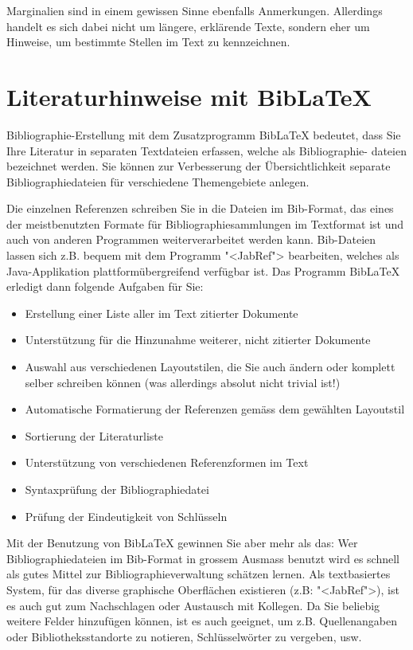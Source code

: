 \documentclass[11pt, a4paper]{article}
\let\oldmarginpar\marginpar
\renewcommand{\marginpar}[1]{\oldmarginpar{\textit{#1}}}
\begin{document}
Marginalien\marginpar{Marginalien} sind in einem gewissen Sinne ebenfalls Anmerkungen. Allerdings handelt es sich dabei nicht um längere, erklärende Texte, sondern eher um Hinweise, um bestimmte Stellen im Text zu kennzeichnen.

\section{Literaturhinweise mit Bib\LaTeX}
Bibliographie-Erstellung mit dem Zusatzprogramm Bib\LaTeX{} bedeutet, dass Sie Ihre Literatur in separaten Textdateien erfassen, welche als Bibliographie- dateien bezeichnet werden. Sie können zur Verbesserung der Übersichtlichkeit separate Bibliographiedateien für verschiedene Themengebiete anlegen.

Die einzelnen Referenzen schreiben Sie in die Dateien im Bib-Format, das eines der meistbenutzten Formate für Bibliographiesammlungen im Textformat ist und auch von anderen Programmen weiterverarbeitet werden kann. Bib-Dateien lassen sich z.B. bequem mit dem Programm "<JabRef"> bearbeiten, welches als Java-Applikation plattformübergreifend verfügbar ist.
Das Programm Bib\LaTeX{} erledigt dann folgende Aufgaben für Sie:
\begin{itemize}
\item Erstellung einer Liste aller im Text zitierter Dokumente
\item Unterstützung für die Hinzunahme weiterer, nicht zitierter Dokumente
\item Auswahl aus verschiedenen Layoutstilen, die Sie auch ändern oder komplett selber schreiben können (was allerdings absolut nicht trivial ist!)
\item Automatische Formatierung der Referenzen gemäss dem gewählten Layoutstil
\item Sortierung der Literaturliste
\item Unterstützung von verschiedenen Referenzformen im Text
\item Syntaxprüfung der Bibliographiedatei
\item Prüfung der Eindeutigkeit von Schlüsseln
\end{itemize}
Mit der Benutzung von Bib\LaTeX{} gewinnen Sie aber mehr als das: Wer Bibliographiedateien im Bib-Format in grossem Ausmass benutzt wird es schnell als gutes Mittel zur Bibliographieverwaltung schätzen lernen. Als textbasiertes System, für das diverse graphische Oberflächen existieren (z.B: "<JabRef">), ist es auch gut zum Nachschlagen oder Austausch mit Kollegen. Da Sie beliebig weitere Felder hinzufügen können, ist es auch geeignet, um z.B. Quellenangaben oder Bibliotheksstandorte zu notieren, Schlüsselwörter zu vergeben, usw.
\end{document}
